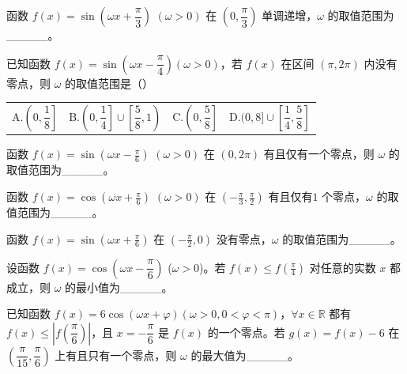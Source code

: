 \begin{homework}
函数 \( f(x) = \sin\left(\omega x + \dfrac{\pi}{3}\right) \)   $ (\omega > 0)$ 在 \( \left(0, \dfrac{\pi}{3}\right) \) 单调递增，\(\omega\) 的取值范围为\_\_\_\_\_。
\end{homework}

\begin{homework}[2016天津卷]
    已知函数 \( f(x) = \sin\left(\omega x - \dfrac{\pi}{4}\right) (\omega > 0) \)，若 \( f(x) \) 在区间 \( (\pi, 2\pi) \) 内没有零点，则 \(\omega\) 的取值范围是（\quad ）

\begin{table}[H]
    \centering
\begin{tabular*}{\hsize}{@{}@{\extracolsep{\fill}}llll@{}}
  $\text{A.}  \left(0, \dfrac{1}{8}\right] $ & $\text{B.}\left(0, \dfrac{1}{4}\right] \cup \left[\dfrac{5}{8}, 1\right) $ & $\text{C.} \left(0, \dfrac{5}{8}\right] $&$\text{D.} (0, 8] \cup \left[\dfrac{1}{4}, \dfrac{5}{8}\right]$
\end{tabular*}
\end{table}

\end{homework}
\begin{homework}
  函数 \( f(x) = \sin\left(\omega x - \frac{\pi}{6}\right) \) $( \omega > 0)$ 在 \( (0, 2\pi) \) 有且仅有一个零点，则 \(\omega\) 的取值范围为\_\_\_\_\_。
\end{homework}
\begin{homework}
函数 \( f(x) = \cos\left(\omega x + \frac{\pi}{6}\right) \)   $( \omega > 0)$ 在 \( \left(-\frac{\pi}{3}, \frac{\pi}{2}\right) \) 有且仅有$ 1$ 个零点，\(\omega\) 的取值范围为\_\_\_\_\_。
\end{homework}
\begin{homework}
    函数 \( f(x) = \sin\left(\omega x + \frac{\pi}{6}\right) \) 在 \( \left(-\frac{\pi}{2}, 0\right) \) 没有零点，\(\omega\) 的取值范围为\_\_\_\_\_。
\end{homework}
\begin{homework}[2018北京卷理]
 设函数 \( f(x) = \cos\left(\omega x - \dfrac{\pi}{6}\right) \) (\(\omega > 0\))。若 \( f(x) \leq f\left(\frac{\pi}{4}\right) \) 对任意的实数 \( x \) 都成立，则 \(\omega\) 的最小值为\_\_\_\_\_。
\end{homework}
\begin{homework}
    已知函数 \( f(x) = 6\cos(\omega x + \varphi) (\omega > 0, 0 < \varphi < \pi) \)，\( \forall x \in \mathbb{R} \) 都有 \( f(x) \leq |f\left(\dfrac{\pi}{6}\right)| \)，且 \( x = -\dfrac{\pi}{6} \) 是 \( f(x) \) 的一个零点。若 \( g(x) = f(x) - 6 \) 在 \( \left(\dfrac{\pi}{15}, \dfrac{\pi}{6}\right) \) 上有且只有一个零点，则 \(\omega\) 的最大值为\_\_\_\_\_。
\end{homework}
